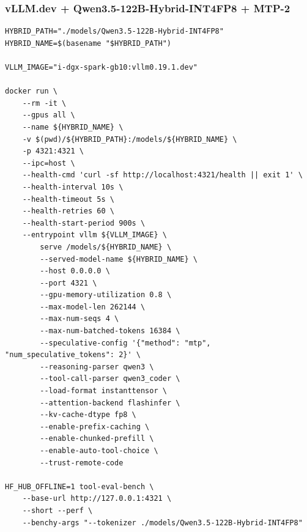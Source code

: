 \documentclass{article}
\begin{document}
\subsubsection{vLLM.dev + Qwen3.5-122B-Hybrid-INT4FP8 + MTP-2}
\begin{lstlisting}
HYBRID_PATH="./models/Qwen3.5-122B-Hybrid-INT4FP8"
HYBRID_NAME=$(basename "$HYBRID_PATH")

VLLM_IMAGE="i-dgx-spark-gb10:vllm0.19.1.dev"

docker run \
    --rm -it \
    --gpus all \
    --name ${HYBRID_NAME} \
    -v $(pwd)/${HYBRID_PATH}:/models/${HYBRID_NAME} \
    -p 4321:4321 \
    --ipc=host \
    --health-cmd 'curl -sf http://localhost:4321/health || exit 1' \
    --health-interval 10s \
    --health-timeout 5s \
    --health-retries 60 \
    --health-start-period 900s \
    --entrypoint vllm ${VLLM_IMAGE} \
        serve /models/${HYBRID_NAME} \
        --served-model-name ${HYBRID_NAME} \
        --host 0.0.0.0 \
        --port 4321 \
        --gpu-memory-utilization 0.8 \
        --max-model-len 262144 \
        --max-num-seqs 4 \
        --max-num-batched-tokens 16384 \
        --speculative-config '{"method": "mtp", "num_speculative_tokens": 2}' \
        --reasoning-parser qwen3 \
        --tool-call-parser qwen3_coder \
        --load-format instanttensor \
        --attention-backend flashinfer \
        --kv-cache-dtype fp8 \
        --enable-prefix-caching \
        --enable-chunked-prefill \
        --enable-auto-tool-choice \
        --trust-remote-code

HF_HUB_OFFLINE=1 tool-eval-bench \
    --base-url http://127.0.0.1:4321 \
    --short --perf \
    --benchy-args "--tokenizer ./models/Qwen3.5-122B-Hybrid-INT4FP8"
\end{lstlisting}
\end{document}

